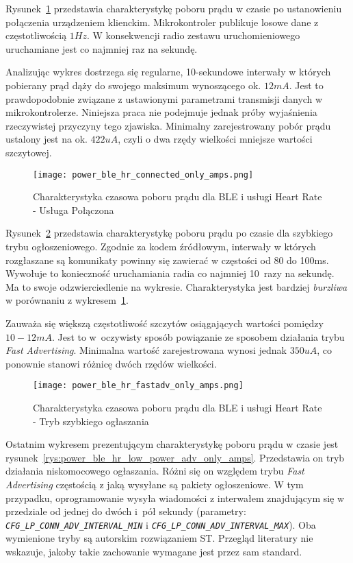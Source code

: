 Rysunek~\ref{rys:power_ble_hr_connected_only_amps} przedstawia charakterystykę poboru prądu
w czasie po ustanowieniu połączenia urządzeniem klienckim. Mikrokontroler publikuje 
losowe dane z częstotliwością $1Hz$. W konsekwencji radio zestawu uruchomieniowego
uruchamiane jest co najmniej raz na sekundę.

Analizując wykres dostrzega się regularne, 10-sekundowe interwały w których pobierany prąd dąży do swojego
maksimum wynoszącego ok. $12mA$. Jest to prawdopodobnie związane z ustawionymi parametrami transmisji
danych w mikrokontrolerze. Niniejsza praca nie podejmuje jednak próby wyjaśnienia rzeczywistej przyczyny tego zjawiska.
Minimalny zarejestrowany pobór prądu ustalony jest na ok. $422uA$, czyli o dwa rzędy wielkości mniejsze wartości
szczytowej.


\begin{figure}[!ht]
	\centering \texttt{[image: power\_ble\_hr\_connected\_only\_amps.png]}
	\caption{Charakterystyka czasowa poboru prądu dla BLE i usługi Heart Rate - Usługa Połączona}
	\label{rys:power_ble_hr_connected_only_amps}
\end{figure}

Rysunek~\ref{rys:power_ble_hr_fastadv_only_amps} przedstawia charakterystykę poboru prądu po czasie
dla szybkiego trybu ogłoszeniowego. Zgodnie za kodem źródłowym, interwały w których rozgłaszane
są komunikaty powinny się zawierać w częstości od 80 do 100ms. Wywołuje to konieczność uruchamiania radia
co najmniej 10~razy na sekundę. Ma to swoje odzwierciedlenie na wykresie. Charakterystyka jest bardziej
\textit{burzliwa} w porównaniu z wykresem~\ref{rys:power_ble_hr_connected_only_amps}. 

Zauważa się większą częstotliwość szczytów osiągających wartości pomiędzy $10-12mA$. Jest to w~oczywisty
sposób powiązanie ze sposobem działania trybu \textit{Fast Advertising}. Minimalna wartość zarejestrowana wynosi jednak
$350uA$, co ponownie stanowi różnicę dwóch rzędów wielkości.

\begin{figure}[!ht]
	\centering \texttt{[image: power\_ble\_hr\_fastadv\_only\_amps.png]}
	\caption{Charakterystyka czasowa poboru prądu dla BLE i usługi Heart Rate - Tryb szybkiego ogłaszania}
	\label{rys:power_ble_hr_fastadv_only_amps}
\end{figure}

Ostatnim wykresem prezentującym charakterystykę poboru prądu w czasie jest rysunek~\ref{rys:power_ble_hr_low_power_adv_only_amps}.
Przedstawia on tryb działania niskomocowego ogłaszania. Różni się on względem trybu \textit{Fast Advertising} częstością z jaką wysyłane
są pakiety ogłoszeniowe. W tym przypadku, oprogramowanie wysyła wiadomości z interwałem znajdującym się w przedziale od 
jednej do dwóch i~pół sekundy (parametry: \textit{\texttt{CFG\_LP\_CONN\_ADV\_INTERVAL\_MIN}} i \textit{\texttt{CFG\_LP\_CONN\_ADV\_INTERVAL\_MAX}}). 
Oba wymienione tryby są autorskim rozwiązaniem ST. Przegląd literatury nie wskazuje, jakoby takie zachowanie wymagane
jest przez sam standard.

